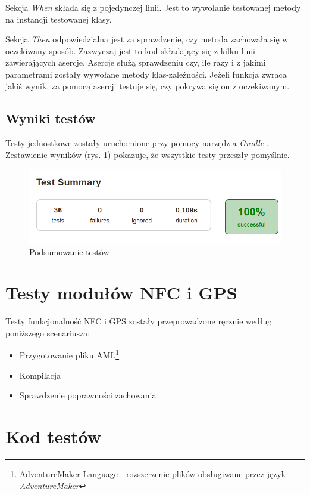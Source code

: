 \documentclass[openright]{xmgr}
\begin{document}
Sekcja \textit{When} składa się z pojedynczej linii. Jest to wywołanie testowanej metody na instancji testowanej klasy.

Sekcja \textit{Then} odpowiedzialna jest za sprawdzenie, czy metoda zachowała się w oczekiwany sposób. Zazwyczaj jest to kod składający się z kilku linii zawierających asercje. Asercje służą sprawdzeniu czy, ile razy i z jakimi parametrami zostały wywołane metody klas-zależności. Jeżeli funkcja zwraca jakiś wynik, za pomocą asercji testuje się, czy pokrywa się on z oczekiwanym.

\subsection{Wyniki testów}
Testy jednostkowe zostały uruchomione przy pomocy narzędzia \textit{Gradle} \cite{Gradle:2017:Doc}. Zestawienie wyników (rys. \ref{tests:results}) pokazuje, że wszystkie testy przeszły pomyślnie.

\begin{figure}[!tbh]
	\centering
	\includegraphics[width=1.0\hsize]{fig/test_summary}
	\caption{Podsumowanie testów}
	\label{tests:results}
\end{figure}

\section{Testy modułów NFC i GPS}

Testy funkcjonalność NFC i GPS zostały przeprowadzone ręcznie według poniższego scenariusza:

\begin{itemize}
  \item Przygotowanie pliku AML\footnote{AdventureMaker Language - rozszerzenie plików obsługiwane przez język \textit{AdventureMaker}}
  \item Kompilacja
  \item Sprawdzenie poprawności zachowania
\end{itemize}

\section{Kod testów}
\end{document}
